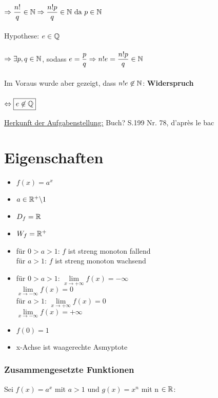 \begin{Beweis}
\begin{enumerate}
$\Rightarrow \dfrac{n!}{q}\in\mathbb{N}\Rightarrow\dfrac{n!p}{q}\in\mathbb{N}\text{ da }p\in\mathbb{N}$\\\\
Hypothese: $e\in\mathbb{Q}$\\\\
$\Rightarrow \exists p,q \in\mathbb{N}$, sodass $e=\dfrac{p}{q}\\
\Rightarrow n!e=\dfrac{n!p}{q}\in\mathbb{N}$\\\\
Im Voraus wurde aber gezeigt, dass $n!e\not\in\mathbb{N}$: \textbf{Widerspruch}\\\\
$\Leftrightarrow \boxed{e\not\in\mathbb{Q}}$\\
\end{enumerate}
\underline{Herkunft der Aufgabenstellung:} Buch? S.199 Nr. 78, d'après le bac
\end{Beweis}
\newpage
\section{Eigenschaften}

\begin{itemize}
\item$f(x)=a^x$
\item$a\in\mathbb{R}^+\backslash 1$
\item$D_f=\mathbb{R}$
\item$W_f=\mathbb{R}^+$
\item für $0>a>1$: $f$ ist streng monoton fallend\\
für $a>1$: $f$ ist streng monoton wachsend
\item für $0>a>1$: $\lim\limits_{x\to +\infty}f(x)=-\infty$\\
			$\lim\limits_{x\to -\infty}f(x)=0$\\
für $a>1$: $\lim\limits_{x\to +\infty}f(x)=0$\\
	        $\lim\limits_{x\to -\infty}f(x)=+\infty$
\item $f(0)=1$
\item x-Achse ist waagerechte Asmyptote

\end{itemize}

\subsubsection{Zusammengesetzte Funktionen}

Sei $f(x)= a^x$ mit $a>1$ und $g(x)=x^n$ mit n $\in \mathbb{R}$:\\

